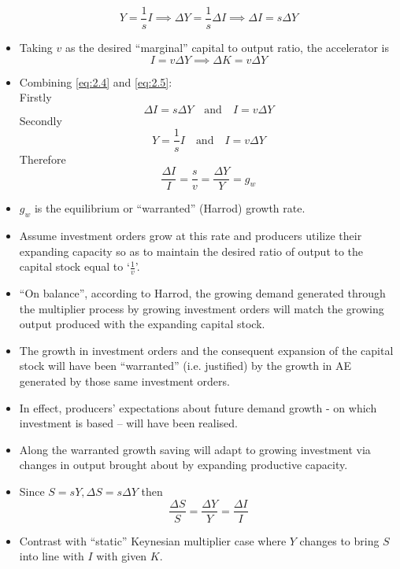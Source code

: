 \documentclass[a4paper,twoside]{article}
\numberwithin{equation}{section}
\numberwithin{figure}{section}
\begin{document}
\begin{itemize}
		\begin{equation}
			Y = \frac{1}{s} I \implies \Delta Y = \frac{1}{s} \Delta I \implies \Delta I = s \Delta Y \label{eq:2.4}
		\end{equation}
		\item Taking \( v \) as the desired ``marginal'' capital to output ratio, the accelerator is
		\begin{equation}
			I = v \Delta Y \implies \Delta K = v \Delta Y \label{eq:2.5}
		\end{equation}
		\item Combining \cref{eq:2.4} and \ref{eq:2.5}:\\
		Firstly
		\[
			\Delta I = s \Delta Y \quad\text{and}\quad I = v \Delta Y
		\]
		Secondly
		\[
			Y = \frac{1}{s} I \quad\text{and}\quad I = v \Delta Y
		\]
		Therefore
		\begin{equation}
			\frac{\Delta I}{I} = \frac{s}{v} = \frac{\Delta Y}{Y} = g_w \label{eq:2.6}
		\end{equation}
		\item \( g_w \) is the equilibrium or ``warranted'' (Harrod) growth rate.
		\item Assume investment orders grow at this rate and producers utilize their expanding capacity so as to maintain the desired ratio of output to the capital stock equal to `\( \frac{1}{v} \)'. 
		\item ``On balance'', according to Harrod, the growing demand generated through the multiplier process by growing investment orders will match the growing output produced with the expanding capital stock.
		\item The growth in investment orders  and the consequent expansion of the capital stock will have been ``warranted'' (i.e. justified) by the growth in AE generated by those same investment orders. 
		\item In effect, producers' expectations about future demand growth - on which investment is based -- will have been realised.
		\item Along the warranted growth saving will adapt to growing investment via changes in output brought about by expanding productive capacity.
		\item Since \( S = sY, \Delta S = s \Delta Y \) then
		\begin{equation}
			\frac{\Delta S}{S} = \frac{\Delta Y}{Y} = \frac{\Delta I}{I} \label{eq:2.7}
		\end{equation}
		\item Contrast with ``static'' Keynesian multiplier case where \( Y \) changes to bring \( S \) into line with \( I \) with given \( K \).

\end{itemize}
\end{document}
